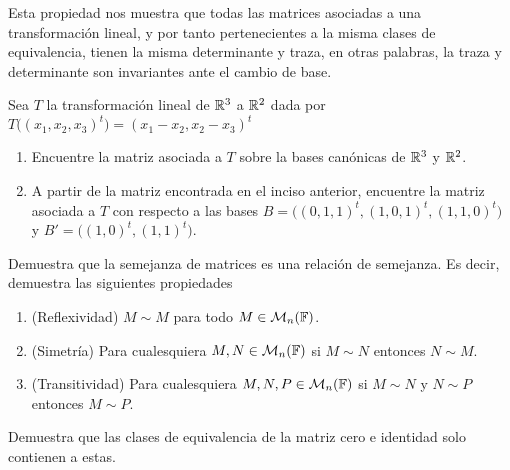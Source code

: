 Esta propiedad nos muestra que todas las matrices asociadas a una transformación lineal, y por tanto pertenecientes a la misma clases de equivalencia, tienen la misma determinante y traza, en otras palabras, la traza y determinante son invariantes ante el cambio de base.


\ExerciseSection

\begin{exerciselist}
  \item Sea $T$ la transformación lineal de $\mathbb{R}^3$ a $\mathbb{R}^2$ dada por $T\bigl((x_1, x_2, x_3)^t\bigr) = (x_1 - x_2, x_2 - x_3)^t$
    \begin{enumerate}
      \item Encuentre la matriz asociada a $T$ sobre la bases canónicas de $\mathbb{R}^3$ y $\mathbb{R}^2$.
      \item A partir de la matriz encontrada en el inciso anterior, encuentre la matriz asociada a $T$ con respecto a las bases $B = \bigl( (0, 1, 1)^t, (1, 0, 1)^t, (1, 1, 0)^t \bigr)$ y $B' = \bigl( (1, 0)^t, (1, 1)^t \bigr)$.
    \end{enumerate}

  \item Demuestra que la semejanza de matrices es una relación de semejanza. Es decir, demuestra las siguientes propiedades
    \begin{enumerate}
      \item (Reflexividad) $M \sim M$ para todo $M \in \mathcal{M}_n(\mathbb{F})$.
      \item (Simetría) Para cualesquiera $M,N \in \mathcal{M}_n(\mathbb{F})$ si $M \sim N$ entonces $N \sim M$.
      \item (Transitividad) Para cualesquiera $M,N,P \in \mathcal{M}_n(\mathbb{F})$ si $M \sim N$ y $N \sim P$ entonces $M \sim P$.
    \end{enumerate}
  
  \item Demuestra que las clases de equivalencia de la matriz cero e identidad solo contienen a estas.
\end{exerciselist}